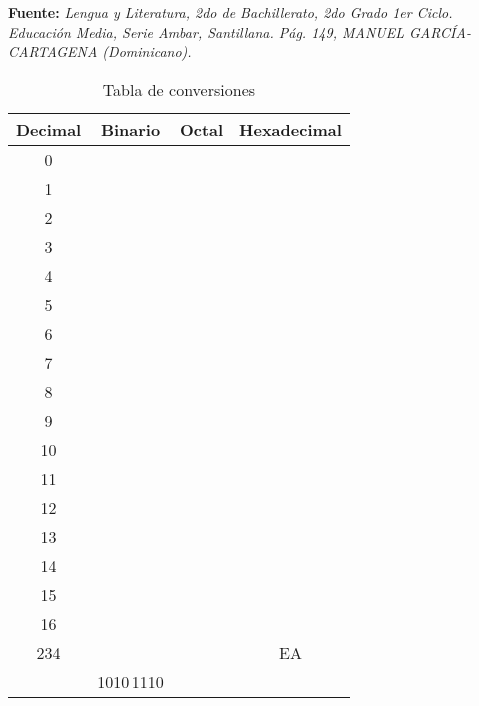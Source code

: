 \documentclass[12pt]{article}
\begin{document}
\begin{enumerate}
\begin{enumerate}
\begin{itemize}
                \end{itemize}

                \textbf{Fuente:} \emph{Lengua y Literatura, 2do de
                Bachillerato, 2do Grado 1er Ciclo. Educación Media, Serie
                Ambar, Santillana. Pág. 149, MANUEL GARCÍA-CARTAGENA
                (Dominicano).}

    \end{enumerate}

\end{enumerate}

\begin{table}[h]

    \centering

    \caption{Tabla de conversiones}
    \label{tablaConversiones}

    \begin{tabular}{ | c | c | c | c | }
        \hline
        Decimal & Binario & Octal & Hexadecimal \\
        \hline
        0 & \hspace{8em} & \hspace{6em} & \hspace{6em} \\
        \hline
        1 & & & \\
        \hline
        2 & & & \\
        \hline
        3 & & & \\
        \hline
        4 & & & \\
        \hline
        5 & & & \\
        \hline
        6 & & & \\
        \hline
        7 & & & \\
        \hline
        8 & & & \\
        \hline
        9 & & & \\
        \hline
        10 & & & \\
        \hline
        11 & & & \\
        \hline
        12 & & & \\
        \hline
        13 & & & \\
        \hline
        14 & & & \\
        \hline
        15 & & & \\
        \hline
        16 & & & \\
        \hline
        234 & & & EA \\
        \hline
        \hspace{6em} & 1010\,1110 & & \\

\end{tabular}
\end{table}
\end{document}
